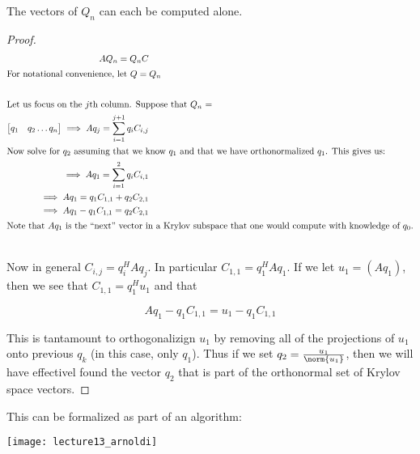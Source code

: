 \documentclass[../main.tex]{subfiles}
\begin{document}
\begin{proposition}
    The vectors of $Q_n$ can each be computed alone.
\end{proposition}
\begin{proof}
    \begin{align*}
        AQ_n = Q_nC \\
        \intertext{For notational convenience, let $Q =Q_n$} \\
        \intertext{Let us focus on the $j$th column. Suppose that $Q_n$ = }
            \begin{bmatrix}
                q_1 & q_2 \dots q_n
            \end{bmatrix}
            \implies Aq_j = \sum_{i=1}^{j+1}q_{i}C_{i,j} \\
            \intertext{Now solve for $q_2$ assuming that we know $q_1$ and that we have orthonormalized $q_1$. This gives us:}
            \implies Aq_1 = \sum_{i=1}^{2}q_{i}C_{i,1} \\
            \implies Aq_1 = q_{1}C_{1,1} + q_{2}C_{2,1} \\
            \implies Aq_1 - q_{1}C_{1,1} = q_{2}C_{2,1} \\
            \intertext{Note that $Aq_1$ is the ``next'' vector in a Krylov subspace that one would compute with knowledge of $q_0$.} \\
    \end{align*}

    Now in general $C_{i,j} = q_i^HAq_j$. In particular $C_{1,1} = q_1^HAq_1$. If we let $u_1 = (Aq_1)$, then we see that $C_{1,1} = q_1^H u_1$ and that 

    \[
        Aq_1 - q_{1}C_{1,1} = u_1 - q_{1} C_{1,1}
    \]

    This is tantamount to orthogonalizign $u_1$ by removing all of the projections of $u_1$ onto previous $q_k$ (in this case, only $q_1$). Thus if we set $q_2 = \frac{u_1}{\norm{u_1}}$, then we will have effectivel found the vector $q_2$ that is part of the orthonormal set of Krylov space vectors.
\end{proof}

\begin{remark}
    This can be formalized as part of an algorithm:

    \texttt{[image: lecture13\_arnoldi]}
\end{remark}
\end{document}

